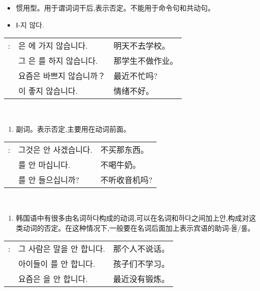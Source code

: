 \begin{grammar}
	\begin{grammarsect}[-지 않다]
		\begin{itemize}
			\item 惯用型。用于谓词词干后,表示否定。不能用于命令句和共动句。
			\item {\color{gray} Ⅰ-지 않다.}
		\end{itemize}
		\begin{tabular}{lll}
			\kr \ruby{例}{예}: &\kr  \ruby{來日}{내일}은 \ruby{學校}{학교}에 가지 않습니다.   & 明天不去学校。  \\
			             &\kr  그 \ruby{學生}{학생}은 \ruby{宿題}{숙제}를 하지 않습니다. & 那学生不做作业。 \\
			             &\kr  요즘은 바쁘지 않습니까？                            & 最近不忙吗?   \\
			             &\kr  \ruby{氣分}{기분}이 좋지 않습니다.                  & 情绪不好。    \\
		\end{tabular}\\
	\end{grammarsect}
	\begin{grammarsect}[안]
		\begin{enumerate}
			\item 副词。表示否定,主要用在动词前面。
		\end{enumerate}
		\begin{tabular}{lll}
			\kr \ruby{例}{예}: &\kr  그것은 안 사겠습니다.                & 不买那东西。  \\
			             & \kr \ruby{牛乳}{우유}를 안 마십니다.      & 不喝牛奶。   \\
			             & \kr \ruby{라디오}{radio}를 안 들으십니까? & 不听收音机吗? \\
		\end{tabular}\\
	\end{grammarsect}
	\begin{enumerate}
		\item 韩国语中有很多由名词하다构成的动词,可以在名词和하다之间加上안,构成对这类动词的否定。在这种情况下,一般要在名词后面加上表示宾语的助词-올/룰。
	\end{enumerate}
	\begin{tabular}{lll}
		\kr \ruby{例}{예}: & \kr 그 사람은 말을 안 합니다.             & 那个人不说话。 \\
		              & \kr 아이들이 \ruby{工夫}{공부}를 안 합니다.  & 孩子们不学习。 \\
		              & \kr 요즘은 \ruby{運動}{운동}을 안 합니다. & 最近没有锻炼。 \\
	\end{tabular}\\
\end{grammar}
